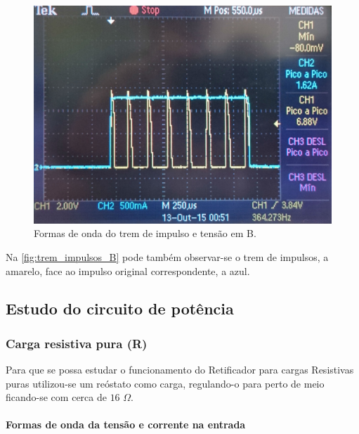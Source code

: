 \documentclass[a4paper,11pt]{article}
\numberwithin{equation}{section}
\begin{document}
\begin{figure}[H]
	\centering
	\includegraphics[keepaspectratio=true, scale=0.09]{img/figs/trem_impulsos_B}
	\caption{Formas de onda do trem de impulso e tensão em B.}
	\label{fig:trem_impulsos_B}
	\vspace{-0.8em}
\end{figure}

Na \autoref{fig:trem_impulsos_B} pode também observar-se o trem de impulsos, a amarelo, face ao impulso original correspondente, a azul.


\subsection{Estudo do circuito de potência}

\subsubsection{Carga resistiva pura (R)}

Para que se possa estudar o funcionamento do Retificador para cargas Resistivas puras utilizou-se um reóstato como carga, regulando-o para perto de meio ficando-se com cerca de $16$ $\Omega$.

\paragraph{Formas de onda da tensão e corrente na entrada}\mbox{}\
\end{document}
